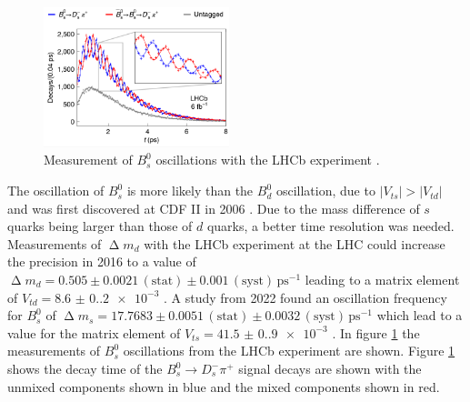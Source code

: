 \begin{figure}
    \centering
    \includegraphics[width=0.48\textwidth]{figs/LHCbResults.png}
    \caption{Measurement of $B_s^0$ oscillations with the LHCb experiment \cite{LHCb2}.}
    \label{fig:LHCbResults}
\end{figure}
The oscillation of $B_s^0$ is more likely than the $B_d^0$ oscillation, due to $|V_{ts}|>|V_{td}|$ and was first discovered at CDF II in 2006 \cite{PhysRevLett.97.242003}.
Due to the mass difference of $s$ quarks being larger than those of $d$ quarks, a better time resolution was needed.
Measurements of $\upDelta m_d$ with the LHCb experiment at the LHC could increase the precision in 2016 \cite{LHCb1} to a value of $\upDelta m_d = 0.505\pm0.0021\,(\text{stat})\pm0.001\,(\text{syst})\,\text{ps}^{-1}$ leading to a matrix element of $V_{td}=\num{8.6(0.2)e-3}$ \cite{Workman:2022ynf}.
A study from 2022 found an oscillation frequency for $B_s^0$ of $\upDelta m_s = 17.7683 \pm 0.0051\,(\text{stat}) \pm 0.0032\,(\text{syst})\,\text{ps}^{-1}$ \cite{LHCb2} which lead to a value for the matrix element of $V_{ts}=\num{41.5(0.9)e-3}$ \cite{Workman:2022ynf}.
In figure \ref{fig:LHCbResults} the measurements of $B_s^0$ oscillations from the LHCb experiment are shown.
Figure \ref{fig:LHCbResults} shows the decay time of the $B_s^0\rightarrow D_s^-\pi^+$ signal decays are shown with the unmixed components shown in blue and the mixed components shown in red.